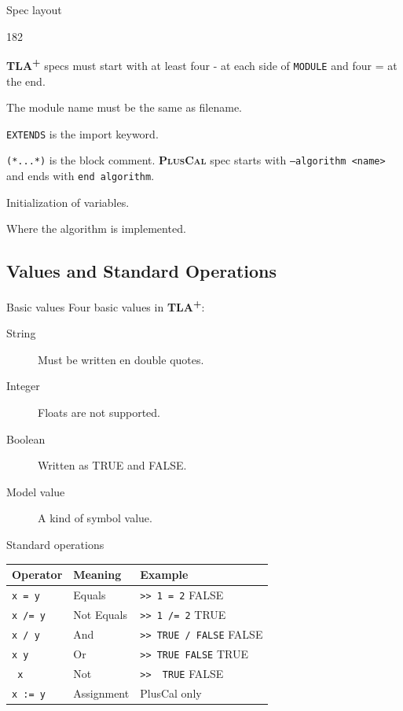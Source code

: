 \documentclass[10pt]{beamer}
\newcommand{\tlaplus}{\textbf{\textsc{TLA\textsuperscript{+}}}\xspace}
\newcommand{\pluscal}{\textbf{\textsc{PlusCal}}\xspace}
\begin{document}
\begin{frame}{Spec layout}
  \begin{dingautolist}{182}
  \item \tlaplus specs must start with at least four - at each side of \texttt{MODULE} and four = at the end.
  \item The module name must be the same as filename.
  \item \texttt{EXTENDS} is the import keyword.
  \item \texttt{(*...*)} is the block comment. \pluscal spec starts with \texttt{--algorithm <name>} and ends with \texttt{end algorithm}.
  \item Initialization of variables.
    \item Where the algorithm is implemented.
  \end{dingautolist}
\end{frame}

\subsection{Values and Standard Operations}

\begin{frame}{Basic values}
  Four basic values in \tlaplus:
  \begin{description}
    \item[String] Must be written en double quotes.
    \item[Integer] Floats are not supported.
    \item[Boolean] Written as TRUE and FALSE.
    \item[Model value] A kind of symbol value.
  \end{description}
\end{frame}

\begin{frame}{Standard operations}
  \begin{table}
    \begin{tabular}{@{} p{2cm}lp{3cm} @{}}
      \toprule
      Operator & Meaning & Example\\
      \midrule
      \texttt{x = y} & Equals & \texttt{>> 1 = 2} \newline FALSE \\
      \texttt{x /= y} & Not Equals & \texttt{>> 1 /= 2} \newline TRUE\\
      \texttt{x /\ y} & And & \texttt{>> TRUE /\ FALSE} \newline FALSE\\
      \texttt{x \/ y} & Or & \texttt{>> TRUE \/ FALSE} \newline TRUE\\
      \texttt{~x} & Not & \texttt{>> ~TRUE} \newline FALSE\\      
      \texttt{x := y} & Assignment & PlusCal only\\
      \bottomrule
    \end{tabular}
  \end{table}
\end{frame}
\end{document}
